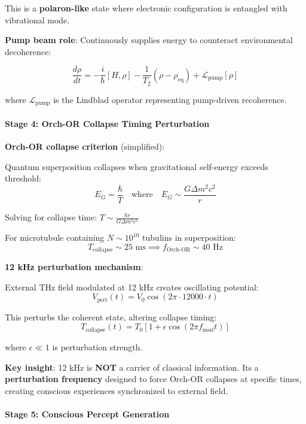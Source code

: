 This is a \textbf{polaron-like} state where electronic configuration is
entangled with vibrational mode.

\textbf{Pump beam role}: Continuously supplies energy to counteract
environmental decoherence:

\[\frac{d\rho}{dt} = -\frac{i}{\hbar}[H, \rho] - \frac{1}{T_2}(\rho - \rho_{\text{eq}}) + \mathcal{L}_{\text{pump}}[\rho]\]

where \(\mathcal{L}_{\text{pump}}\) is the Lindblad operator
representing pump-driven recoherence.

\paragraph{Stage 4: Orch-OR Collapse Timing
Perturbation}\label{stage-4-orch-or-collapse-timing-perturbation}

\textbf{Orch-OR collapse criterion} (simplified):

Quantum superposition collapses when gravitational self-energy exceeds
threshold:
\[E_G = \frac{\hbar}{T} \quad \text{where} \quad E_G \sim \frac{G \Delta m^2 c^2}{r}\]

Solving for collapse time: \(T \sim \frac{\hbar r}{G \Delta m^2 c^2}\)

For microtubule containing \(N \sim 10^{10}\) tubulins in superposition:
\[T_{\text{collapse}} \sim 25 \text{ ms} \implies f_{\text{Orch-OR}} \sim 40 \text{ Hz}\]

\textbf{12 kHz perturbation mechanism}:

External THz field modulated at 12 kHz creates oscillating potential:
\[V_{\text{pert}}(t) = V_0 \cos(2\pi \cdot 12000 \cdot t)\]

This perturbs the coherent state, altering collapse timing:
\[T_{\text{collapse}}(t) = T_0 \left[1 + \epsilon \cos(2\pi f_{\text{mod}} t)\right]\]

where \(\epsilon \ll 1\) is perturbation strength.

\textbf{Key insight}: 12 kHz is \textbf{NOT} a carrier of classical
information. It\textquotesingle s a \textbf{perturbation frequency}
designed to force Orch-OR collapses at specific times, creating
conscious experiences synchronized to external field.

\paragraph{Stage 5: Conscious Percept
Generation}\label{stage-5-conscious-percept-generation}


